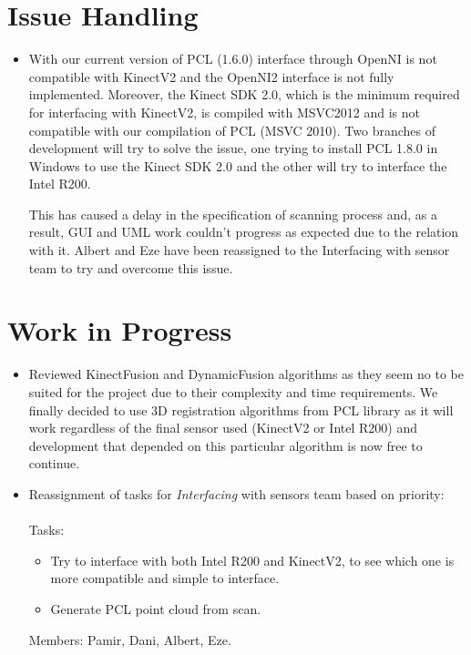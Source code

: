 \documentclass[11pt]{article} %
\begin{document}
\begin{itemize}
	
\end{itemize}

\section{Issue Handling}
\begin{itemize}	
	\item With our current version of PCL (1.6.0) interface through OpenNI is not compatible with KinectV2 and the OpenNI2 interface is not fully implemented. Moreover, the Kinect SDK 2.0, which is the minimum required for interfacing with KinectV2, is compiled with MSVC2012 and is not compatible with our compilation of PCL (MSVC 2010). Two branches of development will try to solve the issue, one trying to install PCL 1.8.0 in Windows to use the Kinect SDK 2.0 and the other will try to interface the Intel R200.

	This has caused a delay in the specification of scanning process and, as a result, GUI and UML work couldn't progress as expected due to the relation with it. Albert and Eze have been reassigned to the Interfacing with sensor team to try and overcome this issue.
\end{itemize}

\section{Work in Progress}

\begin{itemize}
	\item Reviewed KinectFusion and DynamicFusion algorithms  as they seem no to be suited for the project due to their complexity and time requirements. We finally decided to use 3D registration algorithms from PCL library as it will work regardless of the final sensor used (KinectV2 or Intel R200) and development that depended on this particular algorithm is now free to continue.
	
	\item Reassignment of tasks for \emph{Interfacing} with sensors team based on priority:\\
		~\\Tasks:
		\begin{itemize}
			\item Try to interface with both Intel R200 and KinectV2, to see which one is more compatible and simple to interface.
			\item  Generate PCL point cloud from scan.
		\end{itemize}
		Members: Pamir, Dani, Albert, Eze. 
		
\end{itemize}
\end{document}

